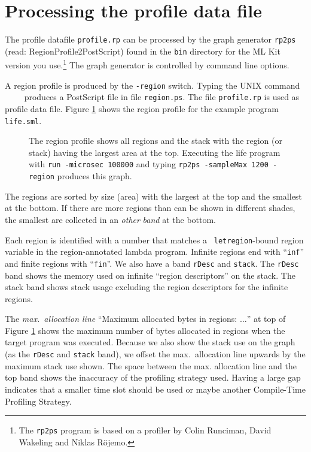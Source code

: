 \documentclass[12pt]{book}
\begin{document}
\section{Processing the profile data file}
The profile datafile \texttt{profile.rp} can be processed by the graph
generator \texttt{rp2ps} (read: RegionProfile2PostScript) found in the
\texttt{bin} directory for the ML Kit version you use.\footnote{The
  \texttt{rp2ps} program is based on a profiler by Colin Runciman,
  David Wakeling and Niklas R\"{o}jemo.} The graph generator is
controlled by command line options.

A region profile is produced by the
\texttt{-region} switch. Typing
the UNIX command ~~~~ produces a PostScript file in
file \texttt{region.ps}. The file \texttt{profile.rp} is used as profile
data file. Figure \ref{prof_eks1.fig} shows the region profile for
the example program \texttt{life.sml}.
\begin{figure}[htb]
\begin{center}
  \caption{The region profile shows all
          regions and the stack with the region (or stack) having the
          largest area at the top. Executing the life program with
          \texttt{run -microsec 100000} and typing \texttt{rp2ps
            -sampleMax 1200 -region} produces this graph.}\label{prof_eks1.fig}
\end{center}
\end{figure}
The regions are sorted by size (area) with the largest at the top and the
smallest at the bottom. If there are more regions than can be shown in
different shades, the smallest are collected in an {\em other\/}
\emph{band} at the bottom.

Each region is identified with a number that matches a {\tt
  letregion}-bound region variable in the region-annotated lambda
program. Infinite regions end with ``{\tt inf}'' and finite regions
with ``{\tt fin}''. We also have a band \texttt{rDesc} and
\texttt{stack}. The \texttt{rDesc} band shows the memory used on
infinite ``region descriptors'' on the stack. The stack band shows
stack usage excluding the region descriptors for the infinite regions.

The \emph{max.\ allocation line} ``Maximum allocated bytes in regions:
$\ldots$'' at top of Figure \ref{prof_eks1.fig} shows the maximum number of
bytes allocated in regions when the target program was executed. Because we
also show the stack use on the graph (as the {\tt rDesc} and {\tt stack} band), we
offset the max.\ allocation line upwards by the maximum stack use shown. The
space between the max. allocation line and the top band shows the
inaccuracy of the profiling strategy used. Having a large gap indicates
that a smaller time slot should be used or maybe another Compile-Time Profiling
Strategy.
\end{document}
